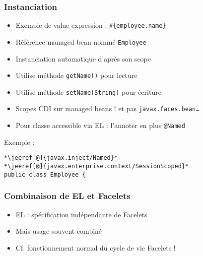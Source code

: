 \documentclass[english, french]{beamer}
\begin{document}
\begin{frame}[fragile]
	\frametitle{Instanciation}
	\begin{itemize}
		\item Exemple de value expression : \texttt{\#\{employee.name\}}
		\item Référence managed bean nommé \texttt{Employee}
		\item Instanciation automatique d’après son scope
		\item Utilise méthode \texttt{getName()} pour lecture
		\item Utilise méthode \texttt{setName(String)} pour écriture
		\item Scopes \alert{CDI} sur managed beans ! {\tiny et pas \texttt{javax.faces.bean…}}
		\item Pour classe accessible via EL : l’annoter en plus \texttt{@Named}
	\end{itemize}
Exemple :
	\begin{lstlisting}[escapechar=*]
*\jeeref[@]{javax.inject/Named}*
*\jeeref[@]{javax.enterprise.context/SessionScoped}*
public class Employee {
	\end{lstlisting}
\end{frame}

\begin{frame}
	\frametitle{Combinaison de EL et Facelets}
	\begin{itemize}
		\item EL : spécification indépendante de Facelets
		\item Mais usage souvent combiné
		\item Cf. fonctionnement normal du cycle de vie Facelets !
	\end{itemize}
\end{frame}
\end{document}
